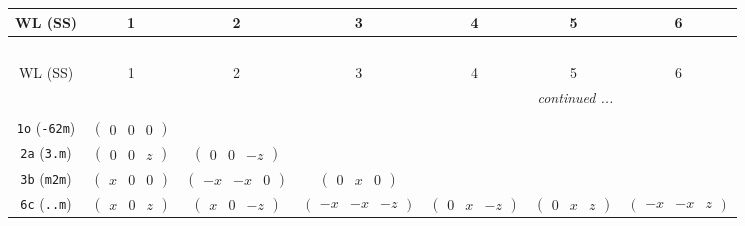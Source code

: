 \documentclass[fleqn,9pt,landscape]{jsarticle}
\begin{document}
\begin{center}
\renewcommand{\arraystretch}{1.2}
\begin{longtable}{ccccccc}
 \hline \hline
WL (SS) & 1 & 2 & 3 & 4 & 5 & 6 \\ \hline \endfirsthead

\multicolumn{6}{l}{\tablename\ \thetable{}} \\
 \hline \hline
WL (SS) & 1 & 2 & 3 & 4 & 5 & 6 \\ \hline \endhead

 \hline \hline
\multicolumn{6}{r}{\footnotesize\it continued ...} \\ \endfoot

 \hline \hline
\multicolumn{6}{r}{} \\ \endlastfoot

{\tt 1o} ({\tt -62m}) & $ \begin{pmatrix} 0 & 0 & 0 \end{pmatrix} $ & $  $ & $  $ & $  $ & $  $ & $  $ \\ \hline
{\tt 2a} ({\tt 3.m}) & $ \begin{pmatrix} 0 & 0 & z \end{pmatrix} $ & $ \begin{pmatrix} 0 & 0 & - z \end{pmatrix} $ & $  $ & $  $ & $  $ & $  $ \\ \hline
{\tt 3b} ({\tt m2m}) & $ \begin{pmatrix} x & 0 & 0 \end{pmatrix} $ & $ \begin{pmatrix} - x & - x & 0 \end{pmatrix} $ & $ \begin{pmatrix} 0 & x & 0 \end{pmatrix} $ & $  $ & $  $ & $  $ \\ \hline
{\tt 6c} ({\tt ..m}) & $ \begin{pmatrix} x & 0 & z \end{pmatrix} $ & $ \begin{pmatrix} x & 0 & - z \end{pmatrix} $ & $ \begin{pmatrix} - x & - x & - z \end{pmatrix} $ & $ \begin{pmatrix} 0 & x & - z \end{pmatrix} $ & $ \begin{pmatrix} 0 & x & z \end{pmatrix} $ & $ \begin{pmatrix} - x & - x & z \end{pmatrix} $ \\ \hline

\end{longtable}
\end{center}
\end{document}
